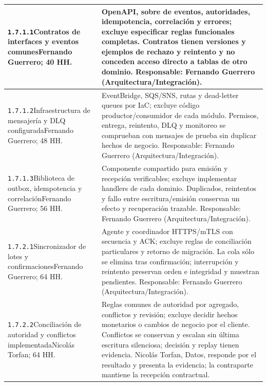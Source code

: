 \begin{longtable}{L{52mm}L{91mm}}
\texttt{1.\allowbreak{}7.\allowbreak{}1.\allowbreak{}1}\newline Contratos de interfaces y eventos comunes\newline Fernando Guerrero; 40 HH. & OpenAPI, sobre de eventos, autoridades, idempotencia, correlación y errores; excluye especificar reglas funcionales completas. Contratos tienen versiones y ejemplos de rechazo y reintento y no conceden acceso directo a tablas de otro dominio. Responsable: Fernando Guerrero (Arquitectura/Integración).\\\hline
\texttt{1.\allowbreak{}7.\allowbreak{}1.\allowbreak{}2}\newline Infraestructura de mensajería y DLQ configurada\newline Fernando Guerrero; 48 HH. & EventBridge, SQS/SNS, rutas y dead-letter queues por IaC; excluye código productor/consumidor de cada módulo. Permisos, entrega, reintento, DLQ y monitoreo se comprueban con mensajes de prueba sin duplicar hechos de negocio. Responsable: Fernando Guerrero (Arquitectura/Integración).\\\hline
\texttt{1.\allowbreak{}7.\allowbreak{}1.\allowbreak{}3}\newline Biblioteca de outbox, idempotencia y correlación\newline Fernando Guerrero; 56 HH. & Componente compartido para emisión y recepción verificables; excluye implementar handlers de cada dominio. Duplicados, reintentos y fallo entre escritura/emisión conservan un efecto y recuperación trazable. Responsable: Fernando Guerrero (Arquitectura/Integración).\\\hline
\texttt{1.\allowbreak{}7.\allowbreak{}2.\allowbreak{}1}\newline Sincronizador de lotes y confirmaciones\newline Fernando Guerrero; 64 HH. & Agente y coordinador HTTPS/mTLS con secuencia y ACK; excluye reglas de conciliación particulares y retorno de migración. La cola sólo se elimina tras confirmación; interrupción y reintento preservan orden e integridad y muestran pendientes. Responsable: Fernando Guerrero (Arquitectura/Integración).\\\hline
\texttt{1.\allowbreak{}7.\allowbreak{}2.\allowbreak{}2}\newline Conciliación de autoridad y conflictos implementada\newline Nicolás Torfan; 64 HH. & Reglas comunes de autoridad por agregado, conflictos y revisión; excluye decidir hechos monetarios o cambios de negocio por el cliente. Conflictos se conservan y escalan sin última escritura silenciosa; decisión y replay tienen evidencia. Nicolás Torfan, Datos, responde por el resultado y presenta la evidencia; la contraparte mantiene la recepción contractual.\\\hline

\end{longtable}
